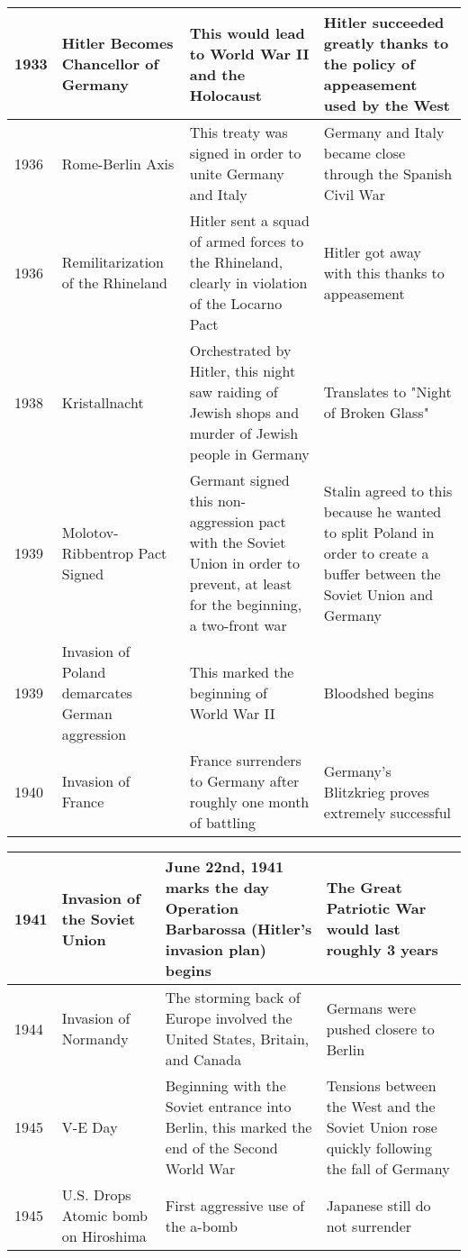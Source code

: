 \documentclass[12pt]{article}
\begin{document}
\begin{enumerate}
\begin{tabular}{|p{}|p{}|p{}|p{}|}
\hline
1933 & Hitler Becomes Chancellor of Germany & This would lead to World War II and the Holocaust  & Hitler succeeded greatly thanks to the policy of appeasement used by the West  \\
\hline
1936 & Rome-Berlin Axis  & This treaty was signed in order to unite Germany and Italy  & Germany and Italy became close through the Spanish Civil War  \\
\hline
1936 & Remilitarization of the Rhineland  & Hitler sent a squad of armed forces to the Rhineland, clearly in violation of the Locarno Pact  & Hitler got away with this thanks to appeasement  \\
\hline
1938 & Kristallnacht & Orchestrated by Hitler, this night saw raiding of Jewish shops and murder of Jewish people in Germany & Translates to "Night of Broken Glass" \\
\hline
1939 & Molotov-Ribbentrop Pact Signed  & Germant signed this non-aggression pact with the Soviet Union in order to prevent, at least for the beginning, a two-front war  & Stalin agreed to this because he wanted to split Poland in order to create a buffer between the Soviet Union and Germany  \\
\hline
1939 & Invasion of Poland demarcates German aggression & This marked the beginning of World War II & Bloodshed begins \\
\hline 
1940 & Invasion of France & France surrenders to Germany after roughly one month of battling & Germany's Blitzkrieg proves extremely successful \\
\hline
\end{tabular}
\newpage
\hspace{-25pt}\begin{tabular}{|p{}|p{}|p{}|p{}|}
\hline
1941 & Invasion of the Soviet Union & June 22nd, 1941 marks the day Operation Barbarossa (Hitler's invasion plan) begins & The Great Patriotic War would last roughly 3 years \\
\hline
1944 & Invasion of Normandy & The storming back of Europe involved the United States, Britain, and Canada & Germans were pushed closere to Berlin  \\
\hline
1945 & V-E Day  & Beginning with the Soviet entrance into Berlin, this marked the end of the Second World War  & Tensions between the West and the Soviet Union rose quickly following the fall of Germany  \\
\hline
1945 & U.S. Drops Atomic bomb on Hiroshima  & First aggressive use of the a-bomb & Japanese still do not surrender \\

\end{tabular}
\end{enumerate}
\end{document}
